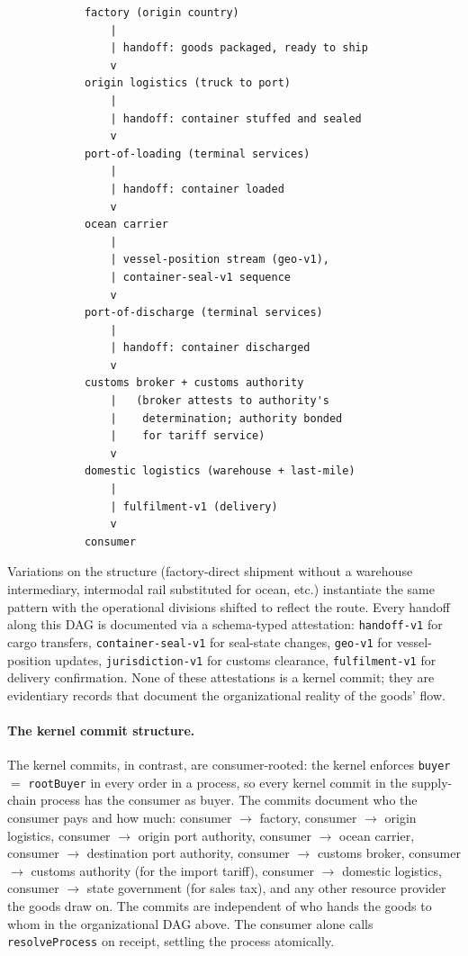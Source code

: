 \documentclass[11pt,a4paper]{article}
\theoremstyle{definition}
\theoremstyle{remark}
\begin{document}
\begin{verbatim}
            factory (origin country)
                |
                | handoff: goods packaged, ready to ship
                v
            origin logistics (truck to port)
                |
                | handoff: container stuffed and sealed
                v
            port-of-loading (terminal services)
                |
                | handoff: container loaded
                v
            ocean carrier
                |
                | vessel-position stream (geo-v1),
                | container-seal-v1 sequence
                v
            port-of-discharge (terminal services)
                |
                | handoff: container discharged
                v
            customs broker + customs authority
                |   (broker attests to authority's
                |    determination; authority bonded
                |    for tariff service)
                v
            domestic logistics (warehouse + last-mile)
                |
                | fulfilment-v1 (delivery)
                v
            consumer
\end{verbatim}

Variations on the structure (factory-direct shipment without a
warehouse intermediary, intermodal rail substituted for ocean,
etc.) instantiate the same pattern with the operational divisions
shifted to reflect the route. Every handoff along this DAG is
documented via a schema-typed attestation: \texttt{handoff-v1}
for cargo transfers, \texttt{container-seal-v1} for seal-state
changes, \texttt{geo-v1} for vessel-position updates,
\texttt{jurisdiction-v1} for customs clearance,
\texttt{fulfilment-v1} for delivery confirmation. None of these
attestations is a kernel commit; they are evidentiary records
that document the organizational reality of the goods' flow.

\paragraph{The kernel commit structure.}
The kernel commits, in contrast, are consumer-rooted: the kernel
enforces \texttt{buyer} $=$ \texttt{rootBuyer} in every order in
a process, so every kernel commit in the supply-chain process has
the consumer as buyer. The commits document who the consumer pays
and how much: consumer $\to$ factory, consumer $\to$ origin
logistics, consumer $\to$ origin port authority, consumer $\to$
ocean carrier, consumer $\to$ destination port authority,
consumer $\to$ customs broker, consumer $\to$ customs authority
(for the import tariff), consumer $\to$ domestic logistics,
consumer $\to$ state government (for sales tax), and any other
resource provider the goods draw on. The commits are independent
of who hands the goods to whom in the organizational DAG above.
The consumer alone calls \texttt{resolveProcess} on receipt,
settling the process atomically.
\end{document}
